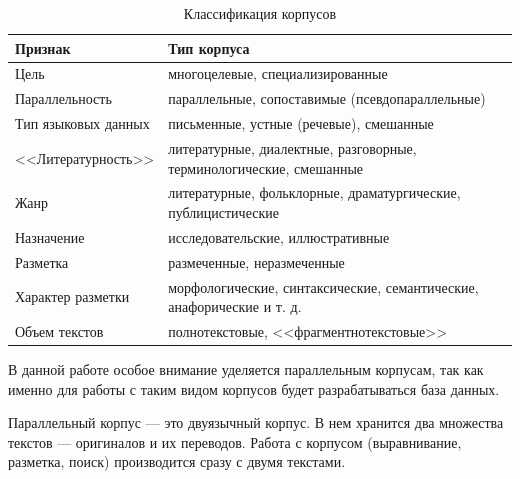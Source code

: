 \begin{table}[H]
\centering
        \caption{Классификация корпусов \cite[с. 16]{cl}}
		\label{tab:coc}
        \begin{adjustbox}{width=\textwidth}
            \begin{tabular}{|p{}|p{}|}
        \hline
        Признак & Тип корпуса \\
        \hline
        \hline
        Цель & многоцелевые, специализированные \\
        \hline
        Параллельность & параллельные, сопоставимые (псевдопараллельные) \\
        \hline
        Тип языковых данных & письменные, устные (речевые), смешанные \\
        \hline
        <<Литературность>> & литературные, диалектные, разговорные, терминологические, смешанные \\
        \hline
        Жанр & литературные, фольклорные, драматургические, публицистические \\
        \hline
        Назначение & исследовательские, иллюстративные \\
        \hline
        Разметка & размеченные, неразмеченные \\
        \hline
        Характер разметки & морфологические, синтаксические, семантические, анафорические и т. д. \\
        \hline
        Объем текстов & полнотекстовые, <<фрагментнотекстовые>> \\
        \hline
		\end{tabular}
        \end{adjustbox}
\end{table}

\newpage

В данной работе особое внимание уделяется параллельным корпусам, так как именно для работы с таким видом корпусов будет разрабатываться база данных. %

Параллельный корпус --- это двуязычный корпус.
В нем хранится два множества текстов --- оригиналов и их переводов.
Работа с корпусом (выравнивание, разметка, поиск) производится сразу с двумя текстами. %

